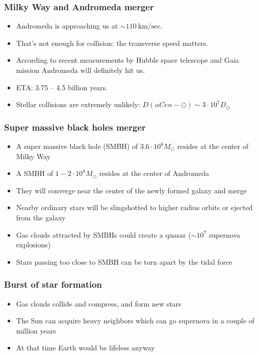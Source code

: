 \documentclass{beamer}
\begin{document}
\begin{frame}
\frametitle{Milky Way and Andromeda merger}
\begin{itemize}
\item Andromeda is approaching us at $\sim 110 \: \mathrm{km/sec}$.
\item That's not enough for collision: the transverse speed matters.
\item According to recent measurements by Hubble space telescope
      \cite{arXiv:1205.6864}
      and Gaia mission \cite{arXiv:1805.04079} Andromeda will
      definitely hit us.
\item ETA: 3.75 -- 4.5 billion years.
\item Stellar collisions are extremely unlikely: $D(\alpha Cen - \odot) \sim 3 \cdot 10^7 D_\odot$ 
\end{itemize}
\end{frame}

\begin{frame}
\frametitle{Super massive black holes merger}
\begin{itemize}
\item A super massive black hole (SMBH) of $3.6 \cdot 10^6 M_\odot$ resides at the center of Milky Way
\item A SMBH of $1 - 2 \cdot 10^8 M_\odot$ resides at the center of Andromeda
\item They will converge near the center of the newly formed galaxy and merge
\item Nearby ordinary stars will be slingshotted to higher radius orbits or ejected from the galaxy
\item Gas clouds attracted by SMBHs could create a quasar ($\sim 10^7$ supernova explosions)
\item Stars passing too close to SMBH can be torn apart by the tidal force
\end{itemize}

\end{frame}

\begin{frame}
\frametitle{Burst of star formation}
\begin{itemize}
\item Gas clouds collide and compress, and form new stars
\item The Sun can acquire heavy neighbors which can go supernova in a couple of million years
\item At that time Earth would be lifeless anyway
\end{itemize}
\end{frame}
\end{document}
